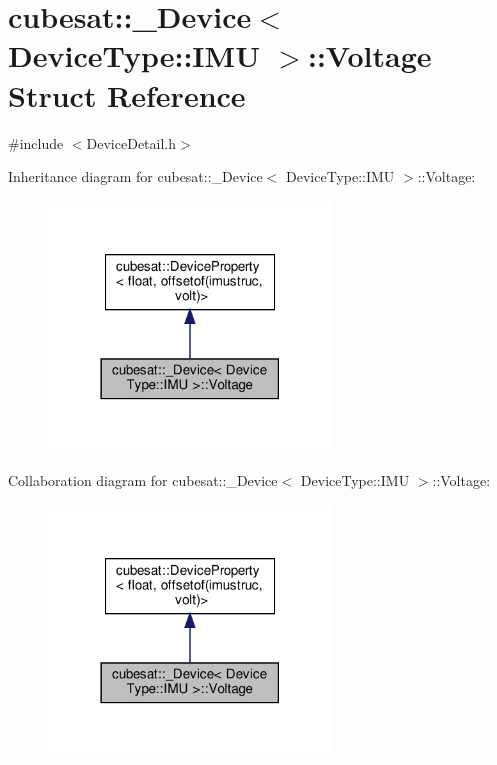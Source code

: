 \hypertarget{structcubesat_1_1__Device_3_01DeviceType_1_1IMU_01_4_1_1Voltage}{}\section{cubesat\+:\+:\+\_\+\+Device$<$ Device\+Type\+:\+:I\+MU $>$\+:\+:Voltage Struct Reference}
\label{structcubesat_1_1__Device_3_01DeviceType_1_1IMU_01_4_1_1Voltage}


{\ttfamily \#include $<$Device\+Detail.\+h$>$}



Inheritance diagram for cubesat\+:\+:\+\_\+\+Device$<$ Device\+Type\+:\+:I\+MU $>$\+:\+:Voltage\+:\nopagebreak
\begin{figure}[H]
\begin{center}
\leavevmode
\includegraphics[width=213pt]{structcubesat_1_1__Device_3_01DeviceType_1_1IMU_01_4_1_1Voltage__inherit__graph}
\end{center}
\end{figure}


Collaboration diagram for cubesat\+:\+:\+\_\+\+Device$<$ Device\+Type\+:\+:I\+MU $>$\+:\+:Voltage\+:\nopagebreak
\begin{figure}[H]
\begin{center}
\leavevmode
\includegraphics[width=213pt]{structcubesat_1_1__Device_3_01DeviceType_1_1IMU_01_4_1_1Voltage__coll__graph}
\end{center}
\end{figure}
